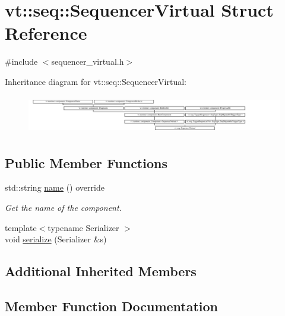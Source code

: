 \hypertarget{structvt_1_1seq_1_1_sequencer_virtual}{}\section{vt\+:\+:seq\+:\+:Sequencer\+Virtual Struct Reference}
\label{structvt_1_1seq_1_1_sequencer_virtual}


{\ttfamily \#include $<$sequencer\+\_\+virtual.\+h$>$}

Inheritance diagram for vt\+:\+:seq\+:\+:Sequencer\+Virtual\+:\begin{figure}[H]
\begin{center}
\leavevmode
\includegraphics[height=1.694915cm]{structvt_1_1seq_1_1_sequencer_virtual}
\end{center}
\end{figure}
\subsection*{Public Member Functions}
\begin{DoxyCompactItemize}
\item 
std\+::string \hyperlink{structvt_1_1seq_1_1_sequencer_virtual_ac51488cfa89d4749b1f5a85f7c2d180c}{name} () override
\begin{DoxyCompactList}\small\item\em Get the name of the component. \end{DoxyCompactList}\item 
{\footnotesize template$<$typename Serializer $>$ }\\void \hyperlink{structvt_1_1seq_1_1_sequencer_virtual_a03ee6d091406db4482bff88cf1f66af4}{serialize} (Serializer \&s)
\end{DoxyCompactItemize}
\subsection*{Additional Inherited Members}


\subsection{Member Function Documentation}
\mbox{\label{structvt_1_1seq_1_1_sequencer_virtual_ac51488cfa89d4749b1f5a85f7c2d180c}} 
